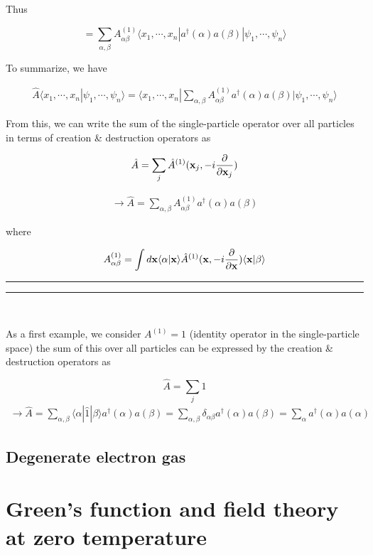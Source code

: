 ﻿\documentclass[twoside]{book}
\numberwithin{equation}{section}
\begin{document}
Thus

\[=\sum_{\alpha,\beta}A_{\alpha\beta}^{(1)}\langle x_1,\cdots,x_n|a^\dagger(\alpha)a(\beta)|\psi_1,\cdots,\psi_n\rangle \]

To summarize, we have

\begin{align}
\hat{A}\langle x_1,\cdots,x_n|\psi_1,\cdots,\psi_n\rangle = \langle x_1,\cdots,x_n|\sum_{\alpha,\beta}A_{\alpha\beta}^{(1)}a^\dagger(\alpha)a(\beta)|\psi_1,\cdots,\psi_n\rangle
\end{align}

From this, we can write the sum of the single-particle operator over all particles in terms of creation \& destruction operators as 

\[\hat{A} = \sum_j\hat{A}^{(1)}({\bf x}_j,-i\frac{\partial}{\partial {\bf x}_j}) \]

\begin{align}
\rightarrow \hat{A} = \sum_{\alpha,\beta} A^{(1)}_{\alpha\beta}a^\dagger(\alpha)a(\beta)
\end{align}

where

\[A^{(1)}_{\alpha\beta} = \int d{\bf x} \langle\alpha|{\bf x}\rangle\hat{A}^{(1)}({\bf x}, -i\frac{\partial}{\partial{\bf x}})\langle{\bf x}|\beta\rangle\]

\hrule
\smallskip
\hrule


\ 

As a first example, we consider $A^{(1)} = 1$ (identity operator in the single-particle space) the sum of this over all particles can be expressed by the creation \& destruction operators as 

\[\hat{A} = \sum_j \hat{1}\]
\begin{align}
\rightarrow\hat{A} = \sum_{\alpha,\beta}\langle\alpha|\hat{1}|\beta\rangle a^\dagger(\alpha)a(\beta) = \sum_{\alpha,\beta}\delta_{\alpha\beta}a^\dagger(\alpha)a(\beta) = \sum_\alpha a^\dagger(\alpha)a(\alpha)
\end{align}%


\section{Degenerate electron gas}



\chapter{Green's function and field theory at zero temperature}
\end{document}
